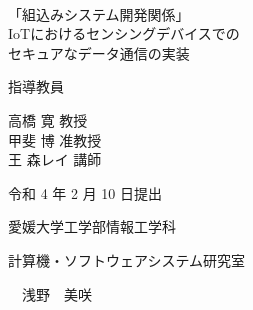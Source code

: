 \pagestyle{empty}
\setlength{\oddsidemargin}{-2.0cm}
\setlength{\textwidth}{20cm}

\
\vspace{3cm}

\begin{center}
{\LARGE {「組込みシステム開発関係」\\IoTにおけるセンシングデバイスでの\\セキュアなデータ通信の実装}}\\

\vspace{9mm}

{\Large 指導教員}

\vspace{5mm}

{\Large 高橋 寛 教授\\甲斐 博 准教授\\王 森レイ 講師}\\

\vspace{6cm}

{\Large 令和 4 年 2 月 10 日提出}\\

\vspace{20mm}

{\Large 愛媛大学工学部情報工学科}\\

\vspace{4mm}

{\Large 計算機・ソフトウェアシステム研究室}\\

\vspace{18mm}

{\huge　浅野　美咲}\\

\end{center}


